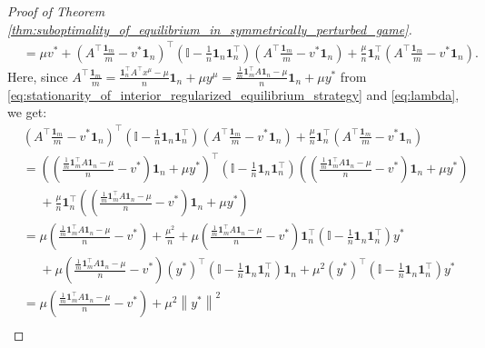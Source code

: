 \documentclass[10pt,a4paper]{amsart}
\newcommand{\bone}{\mathbf{1}}
\begin{document}
\begin{proof}[Proof of Theorem \ref{thm:suboptimality_of_equilibrium_in_symmetrically_perturbed_game}]
\begin{align}
        & = \mu v^{\ast} + \left(A^{\top}\frac{\bone_m}{m} - v^{\ast}\bone_n\right)^{\top}\left(\mathbb{I} - \frac{1}{n}\bone_n\bone_n^{\top}\right)\left(A^{\top}\frac{\bone_m}{m} - v^{\ast}\bone_n\right) + \frac{\mu}{n}\bone_n^{\top}\left(A^{\top}\frac{\bone_m}{m} - v^{\ast}\bone_n\right).
        \label{eq:tmp1}
    \end{align}
    Here, since $A^{\top}\frac{\bone_m}{m} = \frac{\bone_n^{\top}A^{\top}x^{\mu} - \mu}{n} \bone_n + \mu y^{\mu} = \frac{\frac{1}{m}\bone_m^{\top}A\bone_n - \mu}{n} \bone_n + \mu y^{\ast}$ from \eqref{eq:stationarity_of_interior_regularized_equilibrium_strategy} and \eqref{eq:lambda}, we get:
    \begin{align}
        & \left(A^{\top}\frac{\bone_m}{m} - v^{\ast}\bone_n\right)^{\top}\left(\mathbb{I} - \frac{1}{n}\bone_n\bone_n^{\top}\right)\left(A^{\top}\frac{\bone_m}{m} - v^{\ast}\bone_n\right) + \frac{\mu}{n}\bone_n^{\top}\left(A^{\top}\frac{\bone_m}{m} - v^{\ast}\bone_n\right) \nonumber                       \\
        & = \left(\left(\frac{\frac{1}{m}\bone_m^{\top}A\bone_n - \mu}{n} - v^{\ast}\right) \bone_n + \mu y^{\ast}\right)^{\top}\left(\mathbb{I} - \frac{1}{n}\bone_n\bone_n^{\top}\right)\left(\left(\frac{\frac{1}{m}\bone_m^{\top}A\bone_n - \mu}{n} - v^{\ast}\right) \bone_n + \mu y^{\ast}\right) \nonumber \\
        & \phantom{=} + \frac{\mu}{n}\bone_n^{\top}\left(\left(\frac{\frac{1}{m}\bone_m^{\top}A\bone_n - \mu}{n} - v^{\ast}\right) \bone_n + \mu y^{\ast}\right) \nonumber                                                                                                                                        \\
        & = \mu\left(\frac{\frac{1}{m}\bone_m^{\top}A\bone_n - \mu}{n} - v^{\ast}\right) + \frac{\mu^2}{n} + \mu\left(\frac{\frac{1}{m}\bone_m^{\top}A\bone_n - \mu}{n} - v^{\ast}\right)\bone_n^{\top}\left(\mathbb{I} - \frac{1}{n}\bone_n\bone_n^{\top}\right)y^{\ast} \nonumber                               \\
        & \phantom{=} + \mu\left(\frac{\frac{1}{m}\bone_m^{\top}A\bone_n - \mu}{n} - v^{\ast}\right)(y^{\ast})^{\top}\left(\mathbb{I} - \frac{1}{n}\bone_n\bone_n^{\top}\right)\bone_n + \mu^2 (y^{\ast})^{\top}\left(\mathbb{I} - \frac{1}{n}\bone_n\bone_n^{\top}\right)y^{\ast} \nonumber                      \\
        & = \mu\left(\frac{\frac{1}{m}\bone_m^{\top}A\bone_n - \mu}{n} - v^{\ast}\right) + \mu^2 \left\|y^{\ast}\right\|^2 \nonumber                                                                                                                                                                              \\

\end{align}
\end{proof}
\end{document}
